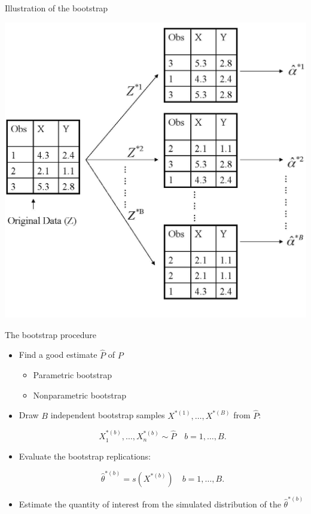 \documentclass[14pt]{beamer}
\begin{document}
\begin{frame}[plain]{Illustration of the bootstrap}

\begin{center}
\includegraphics[width=.7\textwidth]{5-11.png}	
\end{center}
\end{frame}

\begin{frame}[plain]{The bootstrap procedure}
\begin{itemize}
	\item Find a good estimate $\hat P$ of $P$
	\begin{itemize}
		\item Parametric bootstrap
		\item Nonparametric bootstrap
	\end{itemize}
	\item Draw $B$ independent bootstrap samples $X^{*(1)}, \dots, X^{*(B)}$ from $\hat P$:

	$$X_1^{*(b)}, \dots, X_n^{*(b)} \sim \hat P \quad b = 1, \dots, B.$$ 	
	
	\item Evaluate the bootstrap replications:
 
		$$\hat \theta^{*(b)} = s(X^{*(b)}) \quad b = 1, \dots, B.$$	

	\item Estimate the quantity of interest from the simulated distribution of the $\hat \theta^{*(b)}$
\end{itemize}
\end{frame}
\end{document}
